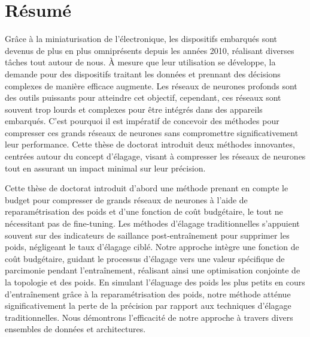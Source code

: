 


\chapter*{Résumé}
Grâce à la miniaturisation de l'électronique, les dispositifs embarqués sont
devenus de plus en plus omniprésents depuis les années 2010, réalisant diverses
tâches tout autour de nous. À mesure que leur utilisation se développe, la
demande pour des dispositifs traitant les données et prennant des décisions
complexes de manière efficace augmente. Les réseaux de neurones profonds sont
des outils puissants pour atteindre cet objectif, cependant, ces réseaux sont
souvent trop lourds et complexes pour être intégrés dans des appareils
embarqués. C'est pourquoi il est impératif de concevoir des méthodes pour
compresser ces grands réseaux de neurones sans compromettre significativement
leur performance. Cette thèse de doctorat introduit deux méthodes innovantes,
centrées autour du concept d'élagage, visant à compresser les réseaux de
neurones tout en assurant un impact minimal sur leur précision.

Cette thèse de doctorat introduit d'abord une méthode prenant en compte le
budget pour compresser de grands réseaux de neurones à l'aide de
reparamétrisation des poids et d'une fonction de coût budgétaire, le tout ne
nécessitant pas de fine-tuning. Les méthodes d'élagage traditionnelles
s'appuient souvent sur des indicateurs de saillance post-entraînement pour
supprimer les poids, négligeant le taux d'élagage ciblé. Notre approche intègre
une fonction de coût budgétaire, guidant le processus d'élagage vers une valeur
spécifique de parcimonie pendant l'entraînement, réalisant ainsi une
optimisation conjointe de la topologie et des poids. En simulant l'élaguage des
poids les plus petits en cours d'entraînement grâce à la reparamétrisation des
poids, notre méthode atténue significativement la perte de la précision par
rapport aux techniques d'élagage traditionnelles. Nous démontrons l'efficacité
de notre approche à travers divers ensembles de données et architectures.


